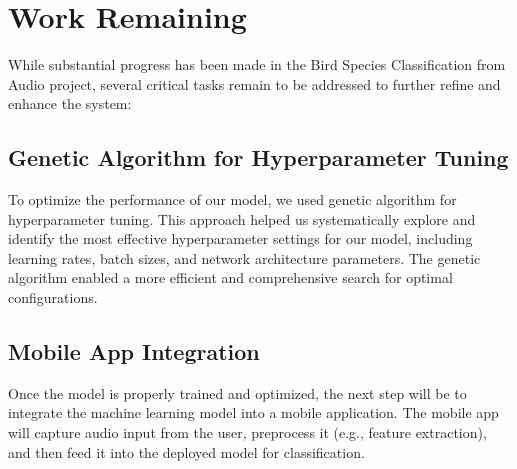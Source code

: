 \newpage

\section{Work Remaining}
While substantial progress has been made in the Bird Species Classification
from Audio project, several critical tasks remain to be addressed to further
refine and enhance the system:



\subsection{Genetic Algorithm for Hyperparameter Tuning}
To optimize the performance of our model, we used genetic algorithm for
hyperparameter tuning. This approach helped us systematically explore and
identify the most effective hyperparameter settings for our model, including
learning rates, batch sizes, and network architecture parameters. The genetic
algorithm enabled a more efficient and comprehensive search for optimal
configurations.

\subsection{Mobile App Integration}
Once the model is properly trained and optimized, the next step will be to
integrate the machine learning model into a mobile application. The mobile app
will capture audio input from the user, preprocess it (e.g., feature
extraction), and then feed it into the deployed model for classification.

